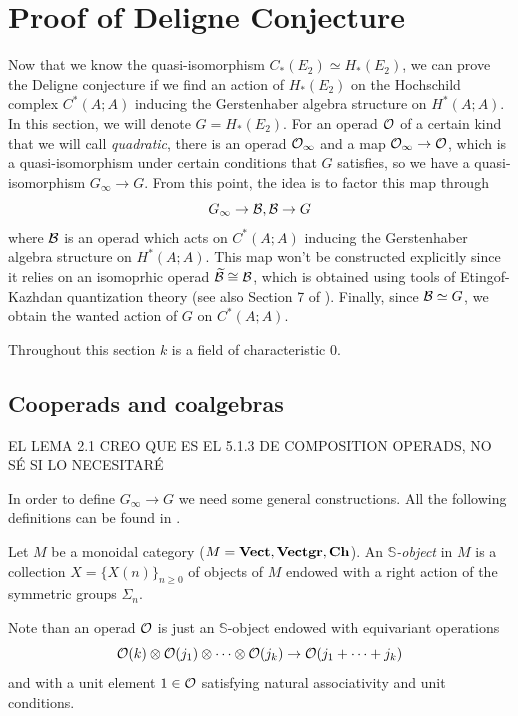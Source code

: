 \documentclass[TFM.tex]{subfiles}
\begin{document}
\chapter{Proof of Deligne Conjecture}

Now that we know the quasi-isomorphism $C_*(E_2)\simeq H_*(E_2)$, we can prove the Deligne conjecture if we find an action of $H_*(E_2)$ on the Hochschild complex $C^*(A;A)$ inducing the Gerstenhaber algebra structure on $H^*(A;A)$. In this section, we will denote $G=H_*(E_2)$. For an operad ${\mathcal O}$ of a certain kind that we will call \emph{quadratic}, there is an operad ${\mathcal O}_\infty$ and a map ${\mathcal O}_\infty\to{\mathcal O}$, which is a quasi-isomorphism under certain conditions that $G$ satisfies, so we have a quasi-isomorphism $G_\infty\to G$. From this point, the idea is to factor this map through
\[
G_\infty\to \mathcal{B},\mathcal{B}\to G
\]
where $\mathcal{B}$ is an operad which acts on $C^*(A;A)$ inducing the Gerstenhaber algebra structure on $H^*(A;A)$.  This map won't be constructed explicitly since it relies on an isomoprhic operad $\widetilde{\mathcal{B}}\cong\mathcal{B}$, which is obtained using tools of Etingof-Kazhdan quantization theory \cite{EK} (see also Section 7 of \cite{Hinich}). Finally, since $\mathcal{B}\simeq G$, we obtain the wanted action of $G$ on $C^*(A;A)$. 

Throughout this section $k$ is a field of characteristic 0. 


\section{Cooperads and coalgebras}

EL LEMA 2.1 CREO QUE ES EL 5.1.3 DE COMPOSITION OPERADS, NO SÉ SI LO NECESITARÉ 

In order to define $G_\infty\to G$ we need some general constructions. All the following definitions can be found in \cite{Hinich}.

\begin{defi}
Let $M$ be a monoidal category ($M=\mathrm{\mathbf{Vect}}, \mathrm{\mathbf{Vectgr}},\mathrm{\mathbf{Ch}}$). An \emph{$\mathbb{S}$-object} in $M$ is a collection $X=\{X(n)\}_{n\geq 0}$ of objects of $M$ endowed with a right action of the symmetric groups $\Sigma_n$.
\end{defi}

Note than an operad ${\mathcal O}$ is just an $\mathbb{S}$-object endowed with
equivariant operations
\[{\mathcal O}(k)\otimes{\mathcal O}(j_1)\otimes\cdots\otimes{\mathcal O}(j_k)\to {\mathcal O}(j_1+\cdots+j_k)\]
and with a unit element $1 \in{\mathcal O}$ satisfying natural associativity and unit conditions.
\end{document}
